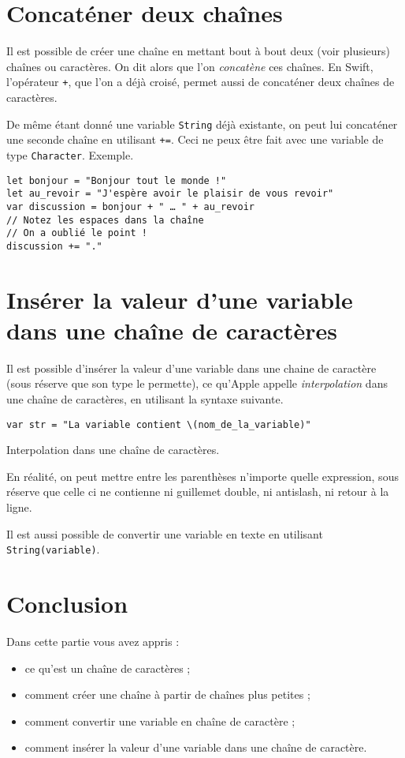 \section{Concaténer deux chaînes}
Il est possible de créer une chaîne en mettant bout à bout deux (voir plusieurs) chaînes ou caractères. On dit alors que l'on \emph{concatène} ces chaînes. En Swift, l'opérateur \verb"+", que l'on a déjà croisé, permet aussi de concaténer deux chaînes de caractères.

De même étant donné une variable \texttt{String} déjà existante, on peut lui concaténer une seconde chaîne en utilisant \verb"+=".
Ceci ne peux être fait avec une variable de type \texttt{Character}. Exemple.

\begin{listing}[h]
\begin{verbatim}
let bonjour = "Bonjour tout le monde !"
let au_revoir = "J'espère avoir le plaisir de vous revoir"
var discussion = bonjour + " … " + au_revoir
// Notez les espaces dans la chaîne
// On a oublié le point !
discussion += "."
\end{verbatim}
\end{listing}
\section{Insérer la valeur d'une variable dans une chaîne de caractères}
Il est possible d'insérer la valeur d'une variable dans une chaine de caractère (sous réserve que son type le permette), ce qu'Apple appelle \emph{interpolation} dans une chaîne de caractères, en utilisant la syntaxe suivante.
\begin{listing}[h]
\begin{verbatim}
var str = "La variable contient \(nom_de_la_variable)"
\end{verbatim}
\caption{Interpolation dans une chaîne de caractères.}
\end{listing}%

En réalité, on peut mettre entre les parenthèses n'importe quelle expression, sous réserve que celle ci ne contienne ni guillemet double, ni antislash, ni retour à la ligne.

Il est aussi possible de convertir une variable en texte en utilisant \texttt{String(variable)}.

\section*{Conclusion}
{}
Dans cette partie vous avez appris :
\begin{itemize}
\item ce qu'est un chaîne de caractères ;
\item comment créer une chaîne à partir de chaînes plus petites ;
\item comment convertir une variable en chaîne de caractère ;
\item comment insérer la valeur d'une variable dans une chaîne de caractère.
\end{itemize}
